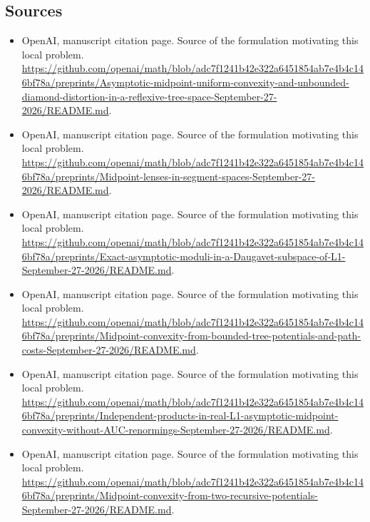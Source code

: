 \documentclass[11pt]{article}
\begin{document}
\subsection{Sources}
\begin{itemize}
\item[S1] OpenAI, manuscript citation page. Source of the formulation motivating this local problem.
\url{https://github.com/openai/math/blob/adc7f1241b42e322a6451854ab7e4b4c146bf78a/preprints/Asymptotic-midpoint-uniform-convexity-and-unbounded-diamond-distortion-in-a-reflexive-tree-space-September-27-2026/README.md}.
\item[S2] OpenAI, manuscript citation page. Source of the formulation motivating this local problem.
\url{https://github.com/openai/math/blob/adc7f1241b42e322a6451854ab7e4b4c146bf78a/preprints/Midpoint-lenses-in-segment-spaces-September-27-2026/README.md}.
\item[S3] OpenAI, manuscript citation page. Source of the formulation motivating this local problem.
\url{https://github.com/openai/math/blob/adc7f1241b42e322a6451854ab7e4b4c146bf78a/preprints/Exact-asymptotic-moduli-in-a-Daugavet-subspace-of-L1-September-27-2026/README.md}.
\item[S4] OpenAI, manuscript citation page. Source of the formulation motivating this local problem.
\url{https://github.com/openai/math/blob/adc7f1241b42e322a6451854ab7e4b4c146bf78a/preprints/Midpoint-convexity-from-bounded-tree-potentials-and-path-costs-September-27-2026/README.md}.
\item[S5] OpenAI, manuscript citation page. Source of the formulation motivating this local problem.
\url{https://github.com/openai/math/blob/adc7f1241b42e322a6451854ab7e4b4c146bf78a/preprints/Independent-products-in-real-L1-asymptotic-midpoint-convexity-without-AUC-renormings-September-27-2026/README.md}.
\item[S6] OpenAI, manuscript citation page. Source of the formulation motivating this local problem.
\url{https://github.com/openai/math/blob/adc7f1241b42e322a6451854ab7e4b4c146bf78a/preprints/Midpoint-convexity-from-two-recursive-potentials-September-27-2026/README.md}.
\end{itemize}
\end{document}
